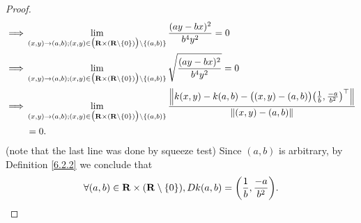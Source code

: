\begin{proof}
\begin{align*}
        \implies & \lim_{(x, y) \to (a, b) ; (x, y) \in \big(\R \times (\R \setminus \{0\})\big) \setminus \{(a, b)\}} \frac{(ay - bx)^2}{b^4 y^2} = 0                                                                                                  \\
        \implies & \lim_{(x, y) \to (a, b) ; (x, y) \in \big(\R \times (\R \setminus \{0\})\big) \setminus \{(a, b)\}} \sqrt{\frac{(ay - bx)^2}{b^4 y^2}} = 0                                                                                           \\
        \implies & \lim_{(x, y) \to (a, b) ; (x, y) \in \big(\R \times (\R \setminus \{0\})\big) \setminus \{(a, b)\}} \frac{\norm*{k(x, y) - k(a, b) - \big((x, y) - (a, b)\big) \big(\frac{1}{b}, \frac{-a}{b^2}\big)^\top}}{\norm*{(x, y) - (a, b)}} \\
                 & = 0.
    \end{align*}
    (note that the last line was done by squeeze test)
    Since \((a, b)\) is arbitrary, by Definition \ref{6.2.2} we conclude that
    \[
        \forall (a, b) \in \R \times (\R \setminus \{0\}), D k(a, b) = \bigg(\frac{1}{b}, \frac{-a}{b^2}\bigg).
    \]


\end{proof}
